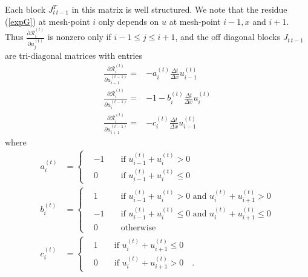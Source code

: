 \documentclass[a4paper,11pt]{article}
\theoremstyle{remark}
\theoremstyle{definition}
\begin{document}
    Each block $J_{t\,t-1}^T$ in this matrix is well structured.  We note
    that the residue (\ref{expG}) at mesh-point $i$ only depends on $u$ at
    mesh-point $i-1,x$ and $i+1$.  Thus
    $\frac{\partial \mathcal{R}_i^{(t)}}{\partial u_j^{(t)}}$
    is nonzero only if $i-1\le j\le i+1$,
    and the off diagonal blocks $J_{t\, t-1}$ are tri-diagonal matrices
    with entries
    \begin{equation} \label{burgerR} \begin{split}
       \frac{\partial \mathcal{R}_i^{(t)}}{\partial u_{i-1}^{(t-1)}}
       =& - a_i^{(t)} \frac{\Delta t}{\Delta x} u_{i-1}^{(t)} \\
       \frac{\partial \mathcal{R}_i^{(t)}}{\partial u_{i  }^{(t-1)}}
       =& - 1 - b_i^{(t)} \frac{\Delta t}{\Delta x} u_{i}^{(t)} \\
       \frac{\partial \mathcal{R}_i^{(t)}}{\partial u_{i+1}^{(t-1)}}
       =& - c_i^{(t)} \frac{\Delta t}{\Delta x} u_{i-1}^{(t)}
    \end{split} \end{equation}
    where
    \[ \begin{split}
       a_i^{(t)} &= \left\{ \begin{aligned}
                        & -1 && \mbox{ if } u_{i-1}^{(t)} + u_i^{(t)} > 0 \\
                        & 0 && \mbox{ if } u_{i-1}^{(t)} + u_i^{(t)} \le 0
                    \end{aligned} \right. \\
       b_i^{(t)} &= \left\{ \begin{aligned}
                        & 1 && \mbox{ if } u_{i-1}^{(t)} + u_i^{(t)} > 0
                            \mbox{ and } u_i^{(t)} + u_{i+1}^{(t)} > 0 \\
                        & -1 && \mbox{ if } u_{i-1}^{(t)} + u_i^{(t)} \le 0
                            \mbox{ and } u_i^{(t)} + u_{i+1}^{(t)} \le 0 \\
                        & 0 && \mbox{ otherwise }
                    \end{aligned} \right. \\
       c_i^{(t)} &= \left\{ \begin{aligned}
                        & 1 && \mbox{ if } u_i^{(t)} + u_{i+1}^{(t)} \le 0 \\
                        & 0 && \mbox{ if } u_i^{(t)} + u_{i+1}^{(t)} > 0
                            \quad .
                    \end{aligned} \right.
    \end{split} \]
    
\end{document}
